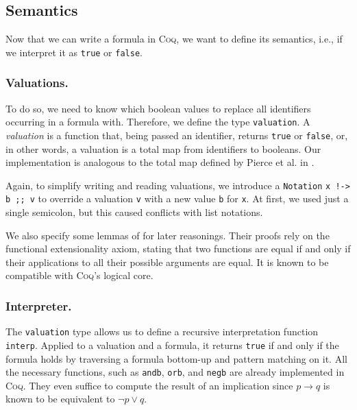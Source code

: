 \subsection{Semantics}

Now that we can write a formula in \textsc{Coq}, we want to define its semantics, i.e., if we interpret it as \texttt{true} or \texttt{false}.

\subsubsection{Valuations.}

To do so, we need to know which boolean values to replace all identifiers occurring in a formula with.
Therefore, we define the type \texttt{valuation}. 
A \emph{valuation} is a function that, being passed an identifier, returns \texttt{true} or \texttt{false}, or, in other words, a valuation is a total map from identifiers to booleans. 
Our implementation is analogous to the total map defined by Pierce et al. in \cite{pierceSF}.

Again, to simplify writing and reading valuations, we introduce a \texttt{Notation} \texttt{x !-> b ;; v} to override a valuation \texttt{v} with a new value \texttt{b} for \texttt{x}. 
At first, we used just a single semicolon, but this caused conflicts with list notations. 

We also specify some lemmas of \cite{pierceSF} for later reasonings. 
Their proofs rely on the functional extensionality axiom, stating that two functions are equal if and only if their applications to all their possible arguments are equal. 
It is known to be compatible with \textsc{Coq}'s logical core.

\subsubsection{Interpreter.}

The \texttt{valuation} type allows us to define a recursive interpretation function \texttt{interp}.
Applied to a valuation and a formula, it returns \texttt{true} if and only if the formula holds by traversing a formula bottom-up and pattern matching on it.
All the necessary functions, such as \texttt{andb}, \texttt{orb}, and \texttt{negb} are already implemented in \textsc{Coq}. 
They even suffice to compute the result of an implication since $p \rightarrow q$ is known to be equivalent to $\neg p \lor q$.

